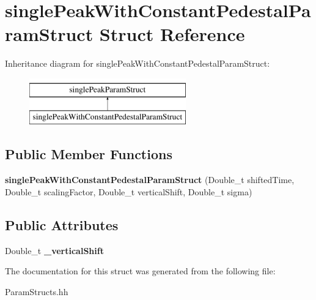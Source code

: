 \hypertarget{structsingle_peak_with_constant_pedestal_param_struct}{}\section{single\+Peak\+With\+Constant\+Pedestal\+Param\+Struct Struct Reference}
\label{structsingle_peak_with_constant_pedestal_param_struct}
Inheritance diagram for single\+Peak\+With\+Constant\+Pedestal\+Param\+Struct\+:\begin{figure}[H]
\begin{center}
\leavevmode
\includegraphics[height=2.000000cm]{structsingle_peak_with_constant_pedestal_param_struct}
\end{center}
\end{figure}
\subsection*{Public Member Functions}
\begin{DoxyCompactItemize}
\item 
\hypertarget{structsingle_peak_with_constant_pedestal_param_struct_a7c214c75ae764ac1f82dd0d384ba8e41}{}{\bfseries single\+Peak\+With\+Constant\+Pedestal\+Param\+Struct} (Double\+\_\+t shifted\+Time, Double\+\_\+t scaling\+Factor, Double\+\_\+t vertical\+Shift, Double\+\_\+t sigma)\label{structsingle_peak_with_constant_pedestal_param_struct_a7c214c75ae764ac1f82dd0d384ba8e41}

\end{DoxyCompactItemize}
\subsection*{Public Attributes}
\begin{DoxyCompactItemize}
\item 
\hypertarget{structsingle_peak_with_constant_pedestal_param_struct_ad062c199965b3e1e920075deba7d150a}{}Double\+\_\+t {\bfseries \+\_\+vertical\+Shift}\label{structsingle_peak_with_constant_pedestal_param_struct_ad062c199965b3e1e920075deba7d150a}

\end{DoxyCompactItemize}


The documentation for this struct was generated from the following file\+:\begin{DoxyCompactItemize}
\item 
Param\+Structs.\+hh\end{DoxyCompactItemize}

